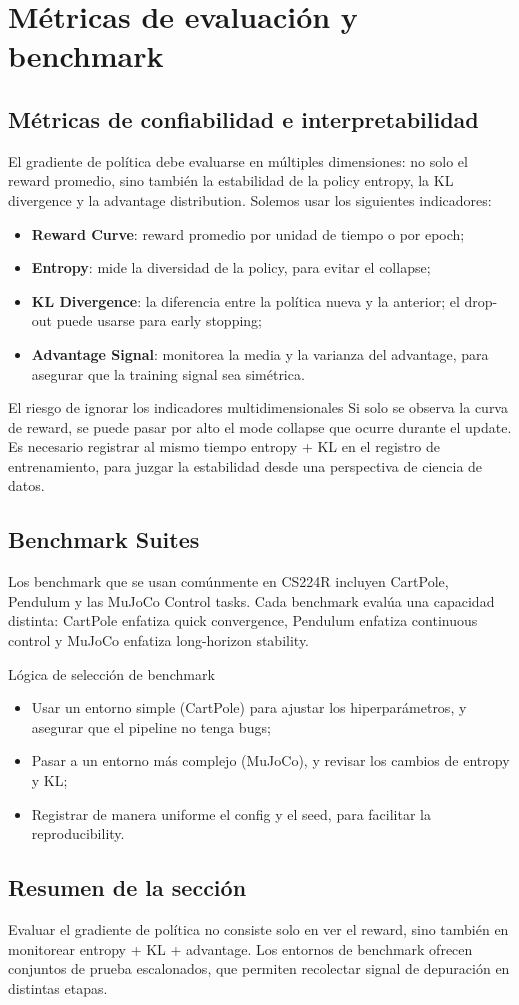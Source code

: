 \section{Métricas de evaluación y benchmark}
\subsection{Métricas de confiabilidad e interpretabilidad}
El gradiente de política debe evaluarse en múltiples dimensiones: no solo el reward promedio, sino también la estabilidad de la policy entropy, la KL divergence y la advantage distribution. Solemos usar los siguientes indicadores:
\begin{itemize}
    \item \textbf{Reward Curve}: reward promedio por unidad de tiempo o por epoch;
    \item \textbf{Entropy}: mide la diversidad de la policy, para evitar el collapse;
    \item \textbf{KL Divergence}: la diferencia entre la política nueva y la anterior; el drop-out puede usarse para early stopping;
    \item \textbf{Advantage Signal}: monitorea la media y la varianza del advantage, para asegurar que la training signal sea simétrica.
\end{itemize}

\begin{warningbox}{El riesgo de ignorar los indicadores multidimensionales}
Si solo se observa la curva de reward, se puede pasar por alto el mode collapse que ocurre durante el update. Es necesario registrar al mismo tiempo entropy + KL en el registro de entrenamiento, para juzgar la estabilidad desde una perspectiva de ciencia de datos.
\end{warningbox}

\subsection{Benchmark Suites}
Los benchmark que se usan comúnmente en CS224R incluyen CartPole, Pendulum y las MuJoCo Control tasks. Cada benchmark evalúa una capacidad distinta: CartPole enfatiza quick convergence, Pendulum enfatiza continuous control y MuJoCo enfatiza long-horizon stability.

\begin{importantbox}{Lógica de selección de benchmark}
\begin{itemize}
    \item Usar un entorno simple (CartPole) para ajustar los hiperparámetros, y asegurar que el pipeline no tenga bugs;
    \item Pasar a un entorno más complejo (MuJoCo), y revisar los cambios de entropy y KL;
\item Registrar de manera uniforme el config y el seed, para facilitar la reproducibility.
\end{itemize}
\end{importantbox}

\subsection{Resumen de la sección}
Evaluar el gradiente de política no consiste solo en ver el reward, sino también en monitorear entropy + KL + advantage. Los entornos de benchmark ofrecen conjuntos de prueba escalonados, que permiten recolectar signal de depuración en distintas etapas.

